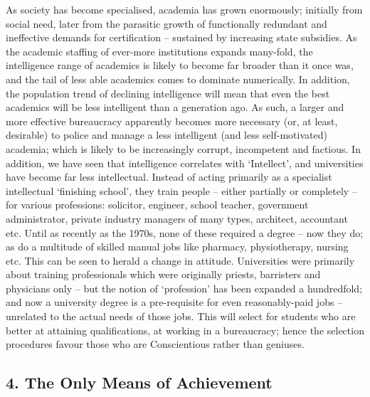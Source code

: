 \documentclass[
]{book}
\begin{document}
As society has become specialised, academia has grown enormously; initially from social need, later from the parasitic growth of functionally redundant and ineffective demands for certification -- sustained by increasing state subsidies. As the academic staffing of ever-more institutions expands many-fold, the intelligence range of academics is likely to become far broader than it once was, and the tail of less able academics comes to dominate numerically. In addition, the population trend of declining intelligence will mean that even the best academics will be less intelligent than a generation ago. As such, a larger and more effective bureaucracy apparently becomes more necessary (or, at least, desirable) to police and manage a less intelligent (and less self-motivated) academia; which is likely to be increasingly corrupt, incompetent and factious. In addition, we have seen that intelligence correlates with `Intellect', and universities have become far less intellectual. Instead of acting primarily as a specialist intellectual `finishing school', they train people -- either partially or completely -- for various professions: solicitor, engineer, school teacher, government administrator, private industry managers of many types, architect, accountant etc. Until as recently as the 1970s, none of these required a degree -- now they do; as do a multitude of skilled manual jobs like pharmacy, physiotherapy, nursing etc. This can be seen to herald a change in attitude. Universities were primarily about training professionals which were originally priests, barristers and physicians only -- but the notion of `profession' has been expanded a hundredfold; and now a university degree is a pre-requisite for even reasonably-paid jobs -- unrelated to the actual needs of those jobs. This will select for students who are better at attaining qualifications, at working in a bureaucracy; hence the selection procedures favour those who are Conscientious rather than geniuses.

\hypertarget{the-only-means-of-achievement}{%
\subsection*{4. The Only Means of Achievement}\label{the-only-means-of-achievement}}
\end{document}
